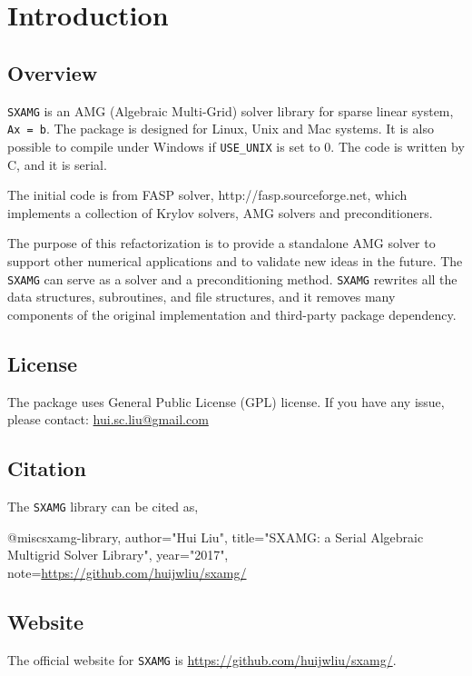 
\chapter{Introduction}

\section{Overview}

\verb|SXAMG| is an AMG (Algebraic Multi-Grid) solver 
library for sparse linear system, \verb|Ax = b|. 
The package is designed for Linux, Unix and Mac systems. 
It is also possible to compile under Windows if \verb|USE_UNIX| is set to 0. 
The code is written by C, and it is serial.

The initial code is from FASP solver, http://fasp.sourceforge.net, which implements a collection of Krylov solvers, AMG solvers and preconditioners.

The purpose of this refactorization is to provide a standalone AMG solver to support other numerical applications and to validate new ideas in the future. The \verb|SXAMG| can serve as a solver and a preconditioning method.
\verb|SXAMG| rewrites all the data structures, subroutines, and file structures, and it removes many components of the original implementation and third-party package dependency.

\section{License}

The package uses General Public License (GPL) license. 
If you have any issue, please contact: \href{mailto: hui.sc.liu@gmail.com}{hui.sc.liu@gmail.com}

\section{Citation}
The \verb|SXAMG| library can be cited as,
\begin{evb}
@misc{sxamg-library,
    author="Hui Liu",
    title="SXAMG: a Serial Algebraic Multigrid Solver Library",
    year="2017",
    note={\url{https://github.com/huijwliu/sxamg/}}
}
\end{evb}


\section{Website}
The official website for \verb|SXAMG| is \url{https://github.com/huijwliu/sxamg/}.

